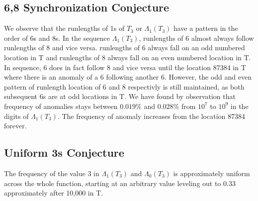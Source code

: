 \documentclass{article}
\begin{document}
\subsection{6,8 Synchronization Conjecture}
We observe that the runlengths of 1s of $T_3$ or $\Lambda{_1(T_3)}$ have a pattern in the order of 6s and 8s. In the sequence $\Lambda{_1(T_3)}$, runlengths of 6 almost always follow runlengths of 8 and vice versa. runlengths of 6 always fall on an odd numbered location in T and runlengths of 8 always fall on an even numbered location in T. In sequence, 6 does in fact follow 8 and vice versa until the location 87384 in T where there is an anomaly of a 6 following another 6. However, the odd and even pattern of runlength location of 6 and 8 respectivly is still maintained, as both subsequent 6s are at odd locations in T. We have found by observation that frequency of anomalies stays between $0.019\%$ and $0.028\%$ from $10^7$ to $10^9$ in the digits of $\Lambda{_1(T_3)}$. The frequency of anomaly increases from the location 87384 forever.

\subsection{Uniform 3s Conjecture}
The frequency of the value 3 in $\Lambda{_1(T_3)}$ and $\Lambda{_0(T_3)}$ is approximately uniform across the whole function, starting at an arbitrary value leveling out to 0.33 approximately after 10,000 in T.
\end{document}
